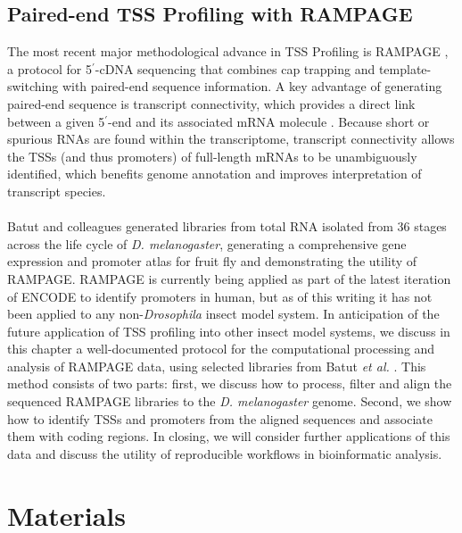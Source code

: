 \documentclass[runningheads,a4paper]{llncs}
\begin{document}
\begin{linenumbers}
\subsection{Paired-end TSS Profiling with RAMPAGE}
The most recent major methodological advance in TSS Profiling is RAMPAGE \cite{Batut:2012kc,Batut:2013fu}, a protocol for 5$^\prime$-cDNA sequencing that combines cap trapping and template-switching with paired-end sequence information. 
A key advantage of generating paired-end sequence is transcript connectivity, which provides a direct link between a given 5$^\prime$-end and its associated mRNA molecule \cite{Batut:2012kc}.
Because short or spurious RNAs are found within the transcriptome, transcript connectivity allows the TSSs (and thus promoters) of full-length mRNAs to be unambiguously identified, which benefits genome annotation and improves interpretation of transcript species.
\\
\\
Batut and colleagues \cite{Batut:2012kc} generated libraries from total RNA isolated from 36 stages across the life cycle of \textit{D. melanogaster}, generating a comprehensive gene expression and promoter atlas for fruit fly and demonstrating the utility of RAMPAGE.
RAMPAGE is currently being applied as part of the latest iteration of ENCODE to identify promoters in human, but as of this writing it has not been applied to any non-\textit{Drosophila} insect model system. 
In anticipation of the future application of TSS profiling into other insect model systems, we discuss in this chapter a well-documented protocol for the computational processing and analysis of RAMPAGE data, using selected libraries from Batut \textit{et al.} \cite{Batut:2012kc}. 
This method consists of two parts: first, we discuss how to process, filter and align the sequenced RAMPAGE libraries to the \textit{D. melanogaster} genome. 
Second, we show how to identify TSSs and promoters from the aligned sequences and associate them with coding regions.
In closing, we will consider further applications of this data and discuss the utility of reproducible workflows in bioinformatic analysis.


\section{Materials}


\end{linenumbers}
\end{document}
